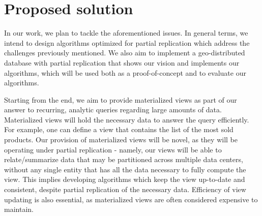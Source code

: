 %

\section{Proposed solution}


In our work, we plan to tackle the aforementioned issues.
In general terms, we intend to design algorithms optimized for partial replication which address the challenges previously mentioned.
We also aim to implement a geo-distributed database with partial replication that shows our vision and implements our algorithms, which will be used both as a proof-of-concept and to evaluate our algorithms.

Starting from the end, we aim to provide materialized views as part of our answer to recurring, analytic queries regarding large amounts of data.
Materialized views will hold the necessary data to answer the query efficiently.
For example, one can define a view that contains the list of the most sold products.
Our provision of materialized views will be novel, as they will be operating under partial replication - namely, our views will be able to relate/summarize data that may be partitioned across multiple data centers, without any single entity that has all the data necessary to fully compute the view.
This implies developing algorithms which keep the view up-to-date and consistent, despite partial replication of the necessary data.
Efficiency of view updating is also essential, as materialized views are often considered expensive to maintain. %

